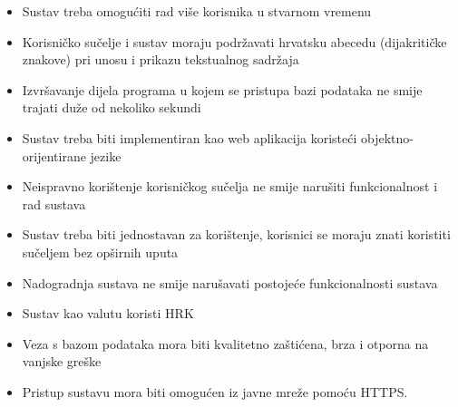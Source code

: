 			 	\begin{itemize}
			 		\item Sustav treba omogućiti rad više korisnika u stvarnom vremenu
			 		
			 		\item Korisničko sučelje i sustav moraju podržavati hrvatsku abecedu (dijakritičke znakove) pri unosu i prikazu tekstualnog sadržaja
			 		
			 		
			 		\item  Izvršavanje dijela programa u kojem se pristupa bazi podataka ne smije trajati duže od nekoliko sekundi
			 		
			 		\item  Sustav treba biti implementiran kao web aplikacija koristeći objektno-orijentirane
			 		jezike
			 		
			 		\item  Neispravno korištenje korisničkog sučelja ne smije narušiti funkcionalnost i
			 		rad sustava
			 		
			 		\item  Sustav treba biti jednostavan za korištenje, korisnici se moraju znati koristiti
			 		sučeljem bez opširnih uputa
			 		
			 		\item  Nadogradnja sustava ne smije narušavati postojeće funkcionalnosti sustava
			 		
			 		\item  Sustav kao valutu koristi HRK
			 		
			 		\item  Veza s bazom podataka mora biti kvalitetno zaštićena, brza i otporna na vanjske greške
			 		
			 		\item  Pristup sustavu mora biti omogućen iz javne mreže pomoću HTTPS.
			 		
			 	\end{itemize}